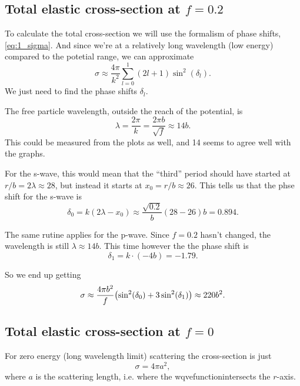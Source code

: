 \documentclass[11pt,letter, swedish, english
]{article}
\begin{document}
\subsection{Total elastic cross-section at $f=0.2$}
To calculate the total cross-section we will use the formalism of
phase shifts, \eqref{eq:1_sigma}. 
And since we're at a relatively long
wavelength (low energy) compared to the potetial range, we can
approximate
\begin{equation}
\sigma\approx\frac{4\pi}{k^2}\sum_{l=0}^1(2l+1)\sin^2(\delta_l).
\end{equation}
We just need to find the phase shifts $\delta_l$.

The free particle wavelength, outside the reach of the potential, is 
\begin{equation}
\lambda=\frac{2\pi}{k}=\frac{2\pi b}{\sqrt{f}}
\approx 14 b.
\end{equation}
This could be measured from the plots as well, and 14 seems to agree
well with the graphs.


For the s-wave, this would mean that the ``third'' period should have
started at $r/b=2\lambda\approx28$, but instead it starts at
$x_0=r/b\approx26$. This tells us that the phse shift for the s-wave
is 
\begin{equation}
\delta_0=k(2\lambda-x_0)\approx\frac{\sqrt{0.2}}{b}(28-26)b
=0.894.
\end{equation}


The same rutine applies for the p-wave. Since $f=0.2$ hasn't changed,
the wavelength is still $\lambda\approx14b$. This time however the the
phase shift is 
\begin{equation}
\delta_1=k\cdot(-4b)= -1.79.
\end{equation}

So we end up getting
\begin{equation}
\sigma\approx\frac{4\pi b^2}{f}
\qty(\sin^2(\delta_0)+3\sin^2(\delta_1))
\approx 220 b^2.
\end{equation}


\subsection{Total elastic cross-section at $f=0$}
For zero energy (long wavelength limit) scattering the cross-section
is just
\begin{equation}
\sigma=4\pi a^2,
\end{equation}
where $a$ is the scattering length, i.e. where the
wqvefunctionintersects the $r$-axis. 
\end{document}
